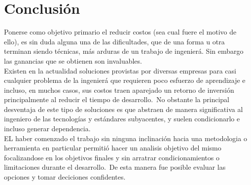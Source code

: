\chapter*{Conclusi\'on}

Ponerse como objetivo primario el reducir costos (sea cual fuere el motivo de
ello), es sin duda alguna una de las dificultades, que de una forma u otra
terminan siendo t\'ecnicas, m\'as arduras de un trabajo de ingenier\'a. Sin
embargo las ganancias que se obtienen son invaluables.\\

Existen en la actualidad soluciones provistas por diversas empresas para casi
cualquier problema de la ingenier\'a que requieren poco esfuerzo de aprendizaje
e incluso, en muchos casos, sus costos traen aparejado un retorno de
inversi\'on principalmente al reducir el tiempo de desarrollo.\
No obstante la principal desventaja de este tipo de soluciones es que abstraen
de manera significativa al ingeniero de las tecnolog\'ias y est\'andares
subyacentes, y suelen condicionarlo e incluso generar dependencia.\\

EL haber comenzado el trabajo sin ninguna inclinaci\'on hacia una metodologia
o herramienta en particular permiti\'o hacer un analisis objetivo del mismo
focalizandose en los objetivos finales y sin arratrar condicionamientos
o limitaciones durante el desarrollo.\ 
De esta manera fue posible evaluar las opciones y tomar deciciones
confidentes.\\





